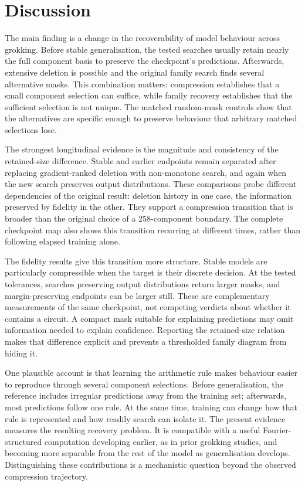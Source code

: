 \section{Discussion}

The main finding is a change in the recoverability of model behaviour across grokking. Before stable generalisation, the tested searches usually retain nearly the full component basis to preserve the checkpoint's predictions. Afterwards, extensive deletion is possible and the original family search finds several alternative masks. This combination matters: compression establishes that a small component selection can suffice, while family recovery establishes that the sufficient selection is not unique. The matched random-mask controls show that the alternatives are specific enough to preserve behaviour that arbitrary matched selections lose.

The strongest longitudinal evidence is the magnitude and consistency of the retained-size difference. Stable and earlier endpoints remain separated after replacing gradient-ranked deletion with non-monotone search, and again when the new search preserves output distributions. These comparisons probe different dependencies of the original result: deletion history in one case, the information preserved by fidelity in the other. They support a compression transition that is broader than the original choice of a 258-component boundary. The complete checkpoint map also shows this transition recurring at different times, rather than following elapsed training alone.

The fidelity results give this transition more structure. Stable models are particularly compressible when the target is their discrete decision. At the tested tolerances, searches preserving output distributions return larger masks, and margin-preserving endpoints can be larger still. These are complementary measurements of the same checkpoint, not competing verdicts about whether it contains a circuit. A compact mask suitable for explaining predictions may omit information needed to explain confidence. Reporting the retained-size relation makes that difference explicit and prevents a thresholded family diagram from hiding it.

One plausible account is that learning the arithmetic rule makes behaviour easier to reproduce through several component selections. Before generalisation, the reference includes irregular predictions away from the training set; afterwards, most predictions follow one rule. At the same time, training can change how that rule is represented and how readily search can isolate it. The present evidence measures the resulting recovery problem. It is compatible with a useful Fourier-structured computation developing earlier, as in prior grokking studies, and becoming more separable from the rest of the model as generalisation develops. Distinguishing these contributions is a mechanistic question beyond the observed compression trajectory.

